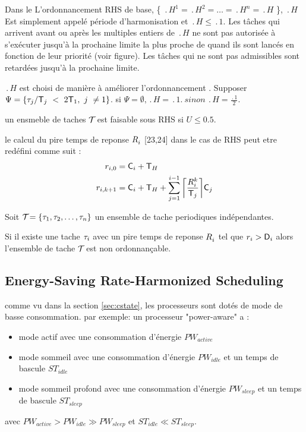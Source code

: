 Dans le L’ordonnancement RHS de base, \{ $\period{H}^1 = \period{H}^2
= … = \period{H}^n = \period{H}$ \}, $\period{H}$ Est simplement
appelé période d'harmonisation et $\period{H} \leq \period{1}$. Les
tâches qui arrivent avant ou après les multiples entiers de
$\period{H}$ ne sont pas autorisée à s'exécuter jusqu'à la prochaine
limite la plus proche de quand ils sont lancés en fonction de leur
priorité (voir figure). Les tâches qui ne sont pas admissibles sont
retardées jusqu'à la prochaine limite.

$\period{H}$ est choisi de manière à améliorer l'ordonnancement
\cite{Rowe10}. Supposer $\Psi=\{\tau_{j} /
\mathsf{T}_{j}~<~2\mathsf{T}_{1},~j~\neq 1\}$. si $\Psi = \emptyset,
\period{H} = \period{1}.~sinon~\period{H} = \frac{\period{1}}{2}$.

\begin{theoreme}
un ensmeble de taches $\mathcal{T}_{}$ est faisable sous RHS si $U \leq
0.5$.
\end{theoreme}

\begin{theoreme}
le calcul du pire temps de reponse $R_i^{}$ [23,24] dans le cas de RHS
peut etre redéfini comme suit : \\
\begin{align}
r_{i,0} & = \mathsf{C}_{i} + \mathsf{T}_{H} 
\\ r_{i,k+1} & = \mathsf{C}_{i} + \mathsf{T}_{H} + \sum_{j = 1}^{i-1} \bigg \lceil \frac{R_i^{k}}{\mathsf{T}_{j}}\bigg \rceil \mathsf{C}_{j}
\end{align}
\end{theoreme}

\begin{theoreme}
Soit $\mathcal{T}_{} = \{\tau_{1}, \tau_{2}, \dots, \tau_{n} \}$ un
ensemble de tache periodiques indépendantes.

Si il existe une tache $\tau_{i}$ avec un pire temps de reponse
$R_i^{}$ tel que $r_i > \mathsf{D}_{i}$ alors l'ensemble de tache
$\mathcal{T}_{}$ est non ordonnançable.
\end{theoreme}

\subsection{Energy-Saving Rate-Harmonized Scheduling}

comme vu dans la section \ref{sec:cstate}, les processeurs sont dotés
de mode de basse consommation.  par exemple: un processeur
"power-aware" a :
\begin{itemize}
\item mode actif avec une consommation d'énergie $PW_{active}$
\item mode sommeil avec une consommation d'énergie
  $PW_{idle}$ et un temps de bascule $ST_{idle}$
\item mode sommeil profond avec une consommation d'énergie
  $PW_{sleep}$ et un temps de bascule $ST_{sleep}$
\end{itemize}
avec $PW_{active} > PW_{idle} \gg PW_{sleep} $ et $ ST_{idle} \ll
ST_{sleep}$.

